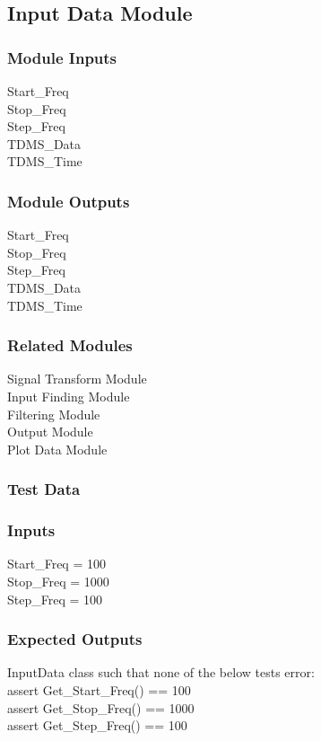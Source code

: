 \documentclass[12pt]{article}
\begin{document}
\subsection{Input Data Module}

\subsubsection{Module Inputs}
Start\_Freq\\
Stop\_Freq\\
Step\_Freq\\
TDMS\_Data\\
TDMS\_Time
\subsubsection{Module Outputs}
Start\_Freq\\
Stop\_Freq\\
Step\_Freq\\
TDMS\_Data\\
TDMS\_Time
\subsubsection{Related Modules}
Signal Transform Module\\
Input Finding Module\\
Filtering Module\\
Output Module\\
Plot Data Module
\subsubsection{Test Data}

\subsubsection{Inputs}
Start\_Freq = 100\\
Stop\_Freq = 1000\\
Step\_Freq = 100\\

\subsubsection{Expected Outputs}
InputData class such that none of the below tests error:\\
assert Get\_Start\_Freq() == 100\\
assert Get\_Stop\_Freq() == 1000\\
assert Get\_Step\_Freq() == 100\\
\end{document}
